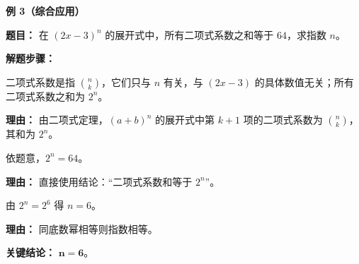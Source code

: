 \begin{examplebox}
	\medskip
	\textbf{\textcolor{CExample}{例 3（综合应用）}}

	\textbf{\textcolor{CExample}{题目：}}
	在 $(2x-3)^n$ 的展开式中，所有二项式系数之和等于 $64$，求指数 $n$。

	\textbf{\textcolor{CExample}{解题步骤：}}
	\begin{description}[style=nextline, leftmargin=2.8em, labelsep=0.5em, itemsep=0.45em]
		\item[\textbf{第一步（区分概念）：}]
			二项式系数是指 $\binom{n}{k}$，它们只与 $n$ 有关，与 $(2x-3)$ 的具体数值无关；所有二项式系数之和为 $2^n$。
			\par\textbf{理由：}
			由二项式定理，$(a+b)^n$ 的展开式中第 $k+1$ 项的二项式系数为 $\binom{n}{k}$，其和为 $2^n$。
		\item[\textbf{第二步（建立方程）：}]
			依题意，$2^n = 64$。
			\par\textbf{理由：}
			直接使用结论：“二项式系数和等于 $2^n$”。
		\item[\textbf{第三步（解方程）：}]
			由 $2^n = 2^6$ 得 $n=6$。
			\par\textbf{理由：}
			同底数幂相等则指数相等。
	\end{description}

	\textbf{\textcolor{CExample}{关键结论：}}
	$\boldsymbol{n=6}$。
\end{examplebox}
